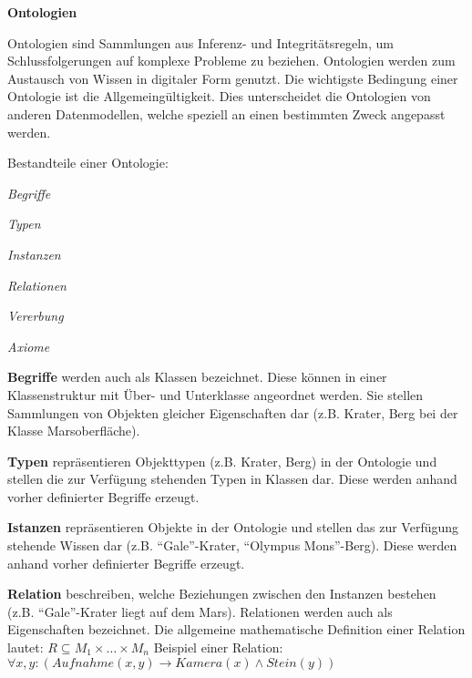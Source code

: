\textbf{Ontologien}

Ontologien sind Sammlungen aus Inferenz- und Integrit{\"a}tsregeln, um
Schlussfolgerungen auf komplexe Probleme zu beziehen. Ontologien werden zum
Austausch von Wissen in digitaler Form genutzt. Die wichtigste Bedingung einer
Ontologie ist die Allgemeing{\"u}ltigkeit. Dies unterscheidet die Ontologien von
anderen Datenmodellen, welche speziell an einen bestimmten Zweck angepasst
werden.

Bestandteile einer Ontologie:

 \begin{compactenum}[I]
   \item \textit{Begriffe}
   \item \textit{Typen}
   \item \textit{Instanzen}
   \item \textit{Relationen}
   \item \textit{Vererbung}
   \item \textit{Axiome}
 \end{compactenum}
   
 \textbf{Begriffe} werden auch als Klassen bezeichnet. Diese
 k{\"o}nnen in einer Klassenstruktur mit {\"U}ber- und Unterklasse angeordnet
 werden. Sie stellen Sammlungen von Objekten gleicher Eigenschaften dar
 (z.B. Krater, Berg bei der Klasse Marsoberfl{\"a}che).
 
 \textbf{Typen} repr{\"a}sentieren Objekttypen (z.B. Krater, Berg) in
 der Ontologie und stellen die zur Verf{\"u}gung stehenden Typen in Klassen dar.
 Diese werden anhand vorher definierter Begriffe erzeugt.
 
 \textbf{Istanzen} repr{\"a}sentieren Objekte in
 der Ontologie und stellen das zur Verf{\"u}gung stehende Wissen dar
 (z.B. "`Gale"'-Krater, "`Olympus Mons"'-Berg). Diese werden anhand vorher
 definierter Begriffe erzeugt.
 
 \textbf{Relation} beschreiben, welche Beziehungen zwischen den Instanzen
 bestehen (z.B. "`Gale"'-Krater liegt auf dem Mars). Relationen werden auch als
 Eigenschaften bezeichnet.
 \newline
 Die allgemeine mathematische Definition einer Relation lautet:
 \newline    \newline
 $R \subseteq M_1 \times \ldots \times M_n$
 \newline
 Beispiel einer Relation:
 \newline    \newline
 $\forall x,y : (Aufnahme(x,y) \rightarrow Kamera(x) \wedge Stein(y))$
 
